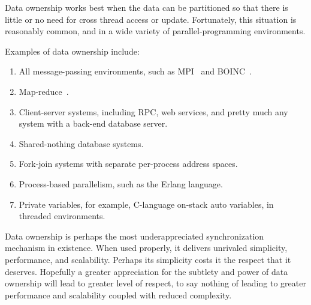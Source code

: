 Data ownership works best when the data can be partitioned so that there
is little or no need for cross thread access or update.
Fortunately, this situation is reasonably common, and in a wide variety
of parallel-programming environments.

Examples of data ownership include:

\begin{enumerate}
\item	All message-passing environments, such as MPI~\cite{MPIForum2008}
	and BOINC~\cite{BOINC2008}.
\item	Map-reduce~\cite{MapReduce2008MIT}.
\item	Client-server systems, including RPC, web services, and
	pretty much any system with a back-end database server.
\item	Shared-nothing database systems.
\item	Fork-join systems with separate per-process address spaces.
\item	Process-based parallelism, such as the Erlang language.
\item	Private variables, for example, C-language on-stack auto variables,
	in threaded environments.
\end{enumerate}

Data ownership is perhaps the most underappreciated synchronization
mechanism in existence.
When used properly, it delivers unrivaled simplicity, performance,
and scalability.
Perhaps its simplicity costs it the respect that it deserves.
Hopefully a greater appreciation for the subtlety and power of data ownership
will lead to greater level of respect, to say nothing of leading to
greater performance and scalability coupled with reduced complexity.

